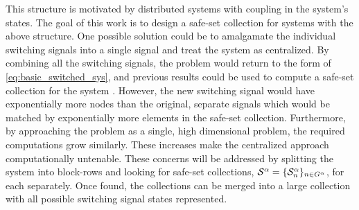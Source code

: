 This structure is motivated by distributed systems with coupling in the system's states. 
The goal of this work is to design a safe-set collection for systems with the above structure. 
One possible solution could be to amalgamate the individual switching signals into a single signal and treat the system as centralized. 
By combining all the switching signals, the problem would return to the form of \autoref{eq:basic_switched_sys}, and previous results could be used to compute a safe-set collection for the system \cite{Danielson2019}. 
However, the new switching signal would have exponentially more nodes than the original, separate signals which would be matched by exponentially more elements in the safe-set collection. 
Furthermore, by approaching the problem as a single, high dimensional problem, the required computations grow similarly. 
These increases make the centralized approach computationally untenable. 
These concerns will be addressed by splitting the system into block-rows and looking for safe-set collections, $\mathcal{S}^{\agentidx}=\{\mathcal{S}^\agentidx_n\}_{n\in\gnumnodes[\agentidx]}$, for each separately. 
Once found, the collections can be merged into a large collection with all possible switching signal states represented.

